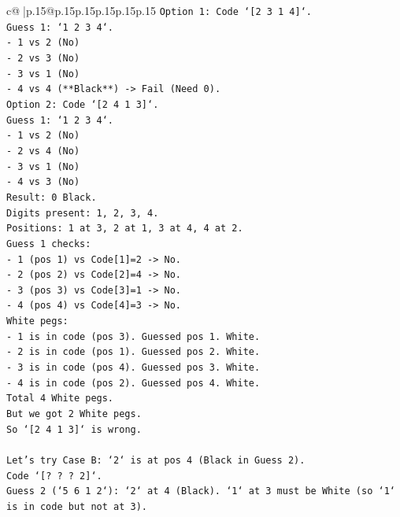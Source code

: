 \documentclass{article}
\begin{document}
{\begin{supertabular}{c@{$\;$}|p{.15\linewidth}@{}p{.15\linewidth}p{.15\linewidth}p{.15\linewidth}p{.15\linewidth}p{.15\linewidth}}
{{{\texttt{Option 1: Code `{[}2 3 1 4{]}`.} \\
\texttt{Guess 1: `1 2 3 4`.} \\
\texttt{{-} 1 vs 2 (No)} \\
\texttt{{-} 2 vs 3 (No)} \\
\texttt{{-} 3 vs 1 (No)} \\
\texttt{{-} 4 vs 4 (**Black**) {-}> Fail (Need 0).} \\
\texttt{Option 2: Code `{[}2 4 1 3{]}`.} \\
\texttt{Guess 1: `1 2 3 4`.} \\
\texttt{{-} 1 vs 2 (No)} \\
\texttt{{-} 2 vs 4 (No)} \\
\texttt{{-} 3 vs 1 (No)} \\
\texttt{{-} 4 vs 3 (No)} \\
\texttt{Result: 0 Black.} \\
\texttt{Digits present: 1, 2, 3, 4.} \\
\texttt{Positions: 1 at 3, 2 at 1, 3 at 4, 4 at 2.} \\
\texttt{Guess 1 checks:} \\
\texttt{{-} 1 (pos 1) vs Code{[}1{]}=2 {-}> No.} \\
\texttt{{-} 2 (pos 2) vs Code{[}2{]}=4 {-}> No.} \\
\texttt{{-} 3 (pos 3) vs Code{[}3{]}=1 {-}> No.} \\
\texttt{{-} 4 (pos 4) vs Code{[}4{]}=3 {-}> No.} \\
\texttt{White pegs:} \\
\texttt{{-} 1 is in code (pos 3). Guessed pos 1. White.} \\
\texttt{{-} 2 is in code (pos 1). Guessed pos 2. White.} \\
\texttt{{-} 3 is in code (pos 4). Guessed pos 3. White.} \\
\texttt{{-} 4 is in code (pos 2). Guessed pos 4. White.} \\
\texttt{Total 4 White pegs.} \\
\texttt{But we got 2 White pegs.} \\
\texttt{So `{[}2 4 1 3{]}` is wrong.} \\
\\ 
\texttt{Let's try Case B: `2` is at pos 4 (Black in Guess 2).} \\
\texttt{Code `{[}? ? ? 2{]}`.} \\
\texttt{Guess 2 (`5 6 1 2`): `2` at 4 (Black). `1` at 3 must be White (so `1` is in code but not at 3).} \\
}}}
\end{supertabular}}
\end{document}
